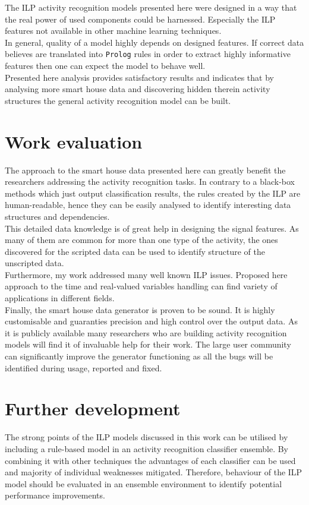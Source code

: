 \documentclass[10pt, a4paper, pdflatex, leqno, twoside, openright]{report}
\begin{document}
The ILP activity recognition models presented here were designed in a way that the real power of used components could be harnessed. Especially the ILP features not available in other machine learning techniques.\\
In general, quality of a model highly depends on designed features. If correct data believes are translated into \texttt{Prolog} rules in order to extract highly informative features then one can expect the model to behave well.\\
Presented here analysis provides satisfactory results and indicates that by analysing more smart house data and discovering hidden therein activity structures the general activity recognition model can be built.

  \section{Work evaluation} %
The approach to the smart house data presented here can greatly benefit the researchers addressing the activity recognition tasks. In contrary to a black-box methods which just output classification results, the rules created by the ILP are human-readable, hence they can be easily analysed to identify interesting data structures and dependencies.\\
This detailed data knowledge is of great help in designing the signal features. As many of them are common for more than one type of the activity, the ones discovered for the scripted data can be used to identify structure of the unscripted data.\\

Furthermore, my work addressed many well known ILP issues. Proposed here approach to the time and real-valued variables handling can find variety of applications in different fields.\\

Finally, the smart house data generator is proven to be sound. It is highly customisable and guaranties precision and high control over the output data. As it is publicly available many researchers who are building activity recognition models will find it of invaluable help for their work. The large user community can significantly improve the generator functioning as all the bugs will be identified during usage, reported and fixed.

  \section{Further development}
The strong points of the ILP models discussed in this work can be utilised by including a rule-based model in an activity recognition classifier ensemble. By combining it with other techniques the advantages of each classifier can be used and majority of individual weaknesses mitigated. Therefore, behaviour of the ILP model should be evaluated in an ensemble environment to identify potential performance improvements.
\end{document}
